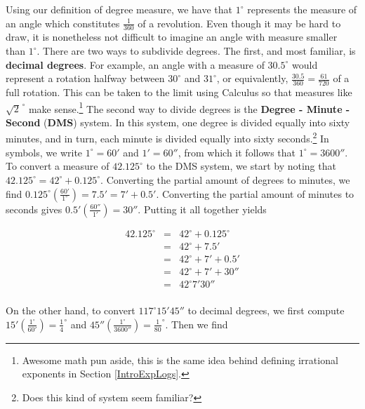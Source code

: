 \documentclass[12pt]{ximera}
\begin{document}
Using our definition of degree measure, we have that $1^{\circ}$ represents the measure of an angle which constitutes $\frac{1}{360}$ of a revolution.  Even though it may be hard to draw, it is nonetheless not difficult to imagine an angle with measure smaller than $1^{\circ}$.  There are two ways to subdivide degrees.  The first, and most familiar, is \textbf{decimal degrees}.  For example, an angle with a measure of $30.5^{\circ}$ would represent a rotation halfway between $30^{\circ}$ and $31^{\circ}$, or equivalently, $\frac{30.5}{360} = \frac{61}{720}$ of a full rotation.  This can be taken to the limit using Calculus so that measures like $\sqrt{2}^{\, \circ}$ make sense.\footnote{Awesome math pun aside, this is the same idea behind defining irrational exponents in Section \ref{IntroExpLogs}.}  The second way to divide degrees is the \textbf{Degree - Minute - Second} (\textbf{DMS}) system.  In this system, one degree is divided equally into sixty minutes, and in turn, each minute is divided equally into sixty seconds.\footnote{Does this kind of system seem familiar?}  In symbols, we write $1^{\circ} = 60'$ and $1' = 60''$, from which it follows that  $1^{\circ} = 3600''$.  To convert a measure of $42.125^{\circ}$ to the DMS system, we start by noting that $42.125^{\circ} = 42^{\circ} + 0.125^{\circ}$. Converting the partial amount of degrees to minutes, we find $0.125^{\circ} \left( \frac{60'}{1^{\circ}} \right) = 7.5' = 7' + 0.5'$. Converting the partial amount of minutes to seconds gives  $0.5' \left(\frac{60''}{1'} \right) = 30''$.  Putting it all together yields 

\[ \begin{array}{rcl}

42.125^{\circ} & = &  42^{\circ} + 0.125^{\circ} \\
               & = & 42^{\circ} + 7.5' \\
               & = & 42^{\circ} + 7' + 0.5' \\
               & = & 42^{\circ} + 7' + 30'' \\
               & = & 42^{\circ} 7' 30'' \\ \end{array} \]
      
On the other hand, to convert $117^{\circ}15'45''$ to decimal degrees, we first compute $15' \left(\frac{1^{\circ}}{60'}\right) = \frac{1}{4}^{\circ}$ and $45'' \left(\frac{1^{\circ}}{3600''}\right) = \frac{1}{80}^{\circ}$. Then we find
\end{document}
